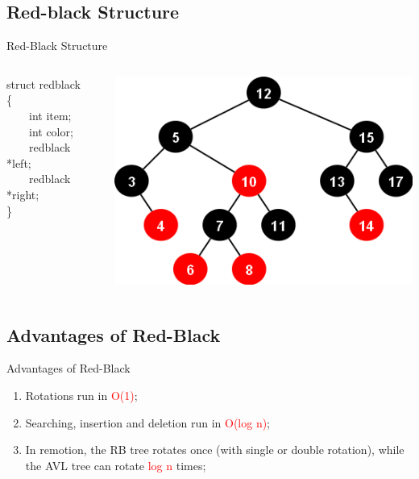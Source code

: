 \documentclass{beamer}
\begin{document}
\subsection{Red-black Structure}
\begin{frame}{Red-Black Structure}
\begin{columns}
\begin{column}{0.5\textwidth}
   \justifying
   \begin{algorithm}
   \SetAlgoLined
   {
       
        struct redblack\\
        \{\\
            \STATE  \ \ \ \ int item;\\
            \STATE  \ \ \ \ int color;\\
            \STATE  \ \ \ \ redblack *left;\\
            \STATE  \ \ \ \ redblack *right;\\
        \}\\
   }
\end{algorithm} %
\end{column}
\begin{column}{0.5\textwidth}
    \begin{center}
     \includegraphics[width=1.0\textwidth]{redblacktree.png}
     \end{center}
\end{column}
\end{columns}
\end{frame}

\subsection{Advantages of Red-Black}
\begin{frame}{Advantages of Red-Black}
\begin{enumerate}
    \item Rotations run in \textcolor{red}{O(1)};
    \item Searching, insertion and deletion run in \textcolor{red}{O(log n)};
    \item In remotion, the RB tree rotates once (with single or double rotation), while the AVL tree can rotate \textcolor{red}{log n} times; 
\end{enumerate}
\end{frame}
\end{document}
